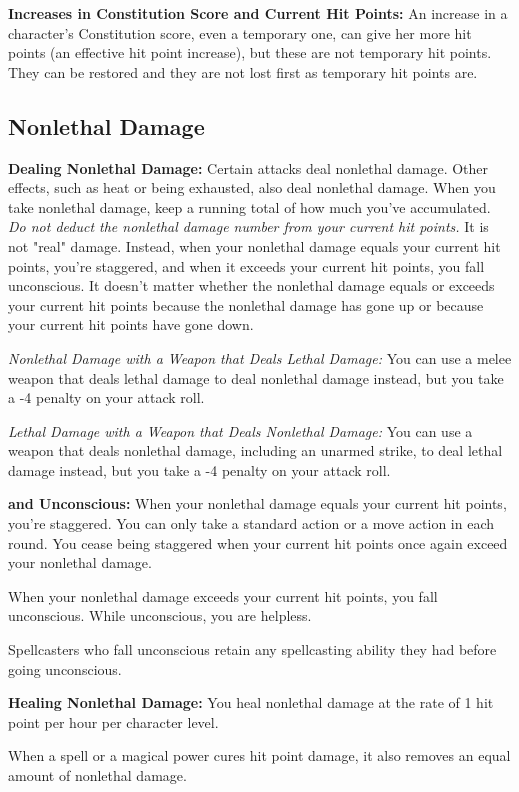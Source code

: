\textbf{Increases in Constitution Score and Current Hit Points:} An increase in a character's Constitution score, even a temporary one, can give her more hit points (an effective hit point increase), but these are not temporary hit points. They can be restored and they are not lost first as temporary hit points are.

\subsection{Nonlethal Damage}

\textbf{Dealing Nonlethal Damage:} Certain attacks deal nonlethal damage. Other effects, such as heat or being exhausted, also deal nonlethal damage. When you take nonlethal damage, keep a running total of how much you've accumulated. \textit{Do not deduct the nonlethal damage number from your current hit points.} It is not "real" damage. Instead, when your nonlethal damage equals your current hit points, you're staggered, and when it exceeds your current hit points, you fall unconscious. It doesn't matter whether the nonlethal damage equals or exceeds your current hit points because the nonlethal damage has gone up or because your current hit points have gone down.

\textit{Nonlethal Damage with a Weapon that Deals Lethal Damage:} You can use a melee weapon that deals lethal damage to deal nonlethal damage instead, but you take a -4 penalty on your attack roll.

\textit{Lethal Damage with a Weapon that Deals Nonlethal Damage:} You can use a weapon that deals nonlethal damage, including an unarmed strike, to deal lethal damage instead, but you take a -4 penalty on your attack roll.

\textbf{ and Unconscious:} When your nonlethal damage equals your current hit points, you're staggered. You can only take a standard action or a move action in each round. You cease being staggered when your current hit points once again exceed your nonlethal damage.

When your nonlethal damage exceeds your current hit points, you fall unconscious. While unconscious, you are helpless.

Spellcasters who fall unconscious retain any spellcasting ability they had before going unconscious.

\textbf{Healing Nonlethal Damage:} You heal nonlethal damage at the rate of 1 hit point per hour per character level.

When a spell or a magical power cures hit point damage, it also removes an equal amount of nonlethal damage.
